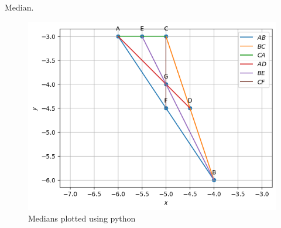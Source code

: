 \begin{table}[H]
        \caption{Median.}
        \centering
        
\end{table}
\begin{figure}[H]
\includegraphics[width=\columnwidth]{1.2/figs/1.2.png}
\caption{Medians plotted using python}
\label{fig:i_1.2_py}
\end{figure}
